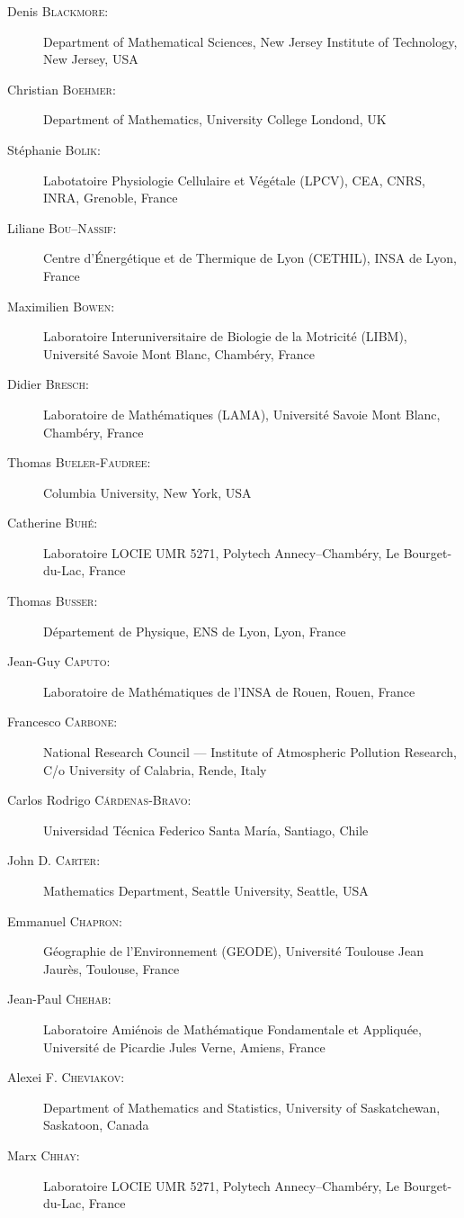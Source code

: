 \documentclass[final, a4paper, oneside, 12pt]{article}
\numberwithin{equation}{section}
\begin{document}
\begin{description}
  \item[Denis \textsc{Blackmore}:] Department of Mathematical Sciences, New Jersey Institute of Technology, New Jersey, USA
  \item[Christian \textsc{Boehmer}:] Department of Mathematics, University College Londond, UK
  \item[St\'ephanie \textsc{Bolik}:] Labotatoire Physiologie Cellulaire et V\'eg\'etale (LPCV), CEA, CNRS, INRA, Grenoble, France
  \item[Liliane \textsc{Bou--Nassif}:] Centre d'\'Energ\'etique et de Thermique de Lyon (CETHIL), INSA de Lyon, France
  \item[Maximilien \textsc{Bowen}:] Laboratoire Interuniversitaire de Biologie de la Motricit\'e (LIBM), Universit\'e Savoie Mont Blanc, Chamb\'ery, France
  \item[Didier \textsc{Bresch}:] Laboratoire de Math\'ematiques (LAMA), Universit\'e Savoie Mont Blanc, Chamb\'ery, France
  \item[Thomas \textsc{Bueler-Faudree}:] Columbia University, New York, USA
  \item[Catherine \textsc{Buh\'e}:] Laboratoire LOCIE UMR 5271, Polytech Annecy--Chamb\'ery, Le Bourget-du-Lac, France
  \item[Thomas \textsc{Busser}:] D\'epartement de Physique, ENS de Lyon, Lyon, France
  \item[Jean-Guy \textsc{Caputo}:] Laboratoire de Math\'ematiques de l'INSA de Rouen, Rouen, France
  \item[Francesco \textsc{Carbone}:] National Research Council --- Institute of Atmospheric Pollution Research, C/o University of Calabria, Rende, Italy
  \item[Carlos Rodrigo \textsc{Cárdenas-Bravo}:] Universidad Técnica Federico Santa María, Santiago, Chile
  \item[John D. \textsc{Carter}:] Mathematics Department, Seattle University, Seattle, USA
  \item[Emmanuel \textsc{Chapron}:] G\'eographie de l'Environnement (GEODE), Universit\'e Toulouse Jean Jaur\`es, Toulouse, France
  \item[Jean-Paul \textsc{Chehab}:] Laboratoire Ami\'enois de Math\'ematique Fondamentale et Appliqu\'ee, Universit\'e de Picardie Jules Verne, Amiens, France
  \item[Alexei F. \textsc{Cheviakov}:] Department of Mathematics and Statistics, University of Saskatchewan, Saskatoon, Canada
  \item[Marx \textsc{Chhay}:] Laboratoire LOCIE UMR 5271, Polytech Annecy--Chamb\'ery, Le Bourget-du-Lac, France

\end{description}
\end{document}
